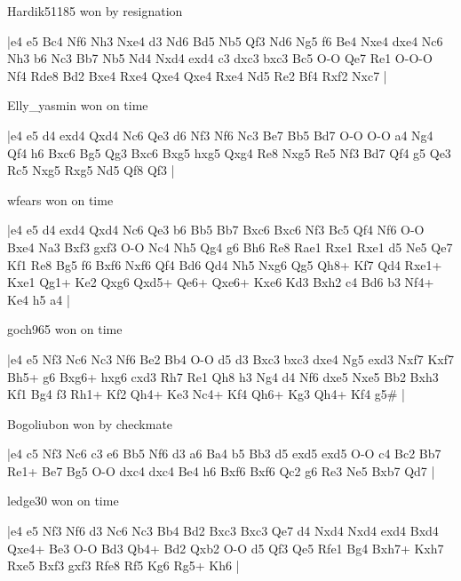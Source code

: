 \showboard

Hardik51185 won by resignation

\makegametitle
|e4 e5 Bc4 Nf6 Nh3 Nxe4 d3 Nd6 Bd5 Nb5 Qf3 Nd6 Ng5 f6 Be4 Nxe4 dxe4 Nc6 Nh3 b6 Nc3 Bb7 Nb5 Nd4 Nxd4 exd4 c3 dxc3 bxc3 Bc5 O-O Qe7 Re1 O-O-O Nf4 Rde8 Bd2 Bxe4 Rxe4 Qxe4 Qxe4 Rxe4 Nd5 Re2 Bf4 Rxf2 Nxc7  |

\showboard

Elly\_yasmin won on time

\makegametitle
|e4 e5 d4 exd4 Qxd4 Nc6 Qe3 d6 Nf3 Nf6 Nc3 Be7 Bb5 Bd7 O-O O-O a4 Ng4 Qf4 h6 Bxc6 Bg5 Qg3 Bxc6 Bxg5 hxg5 Qxg4 Re8 Nxg5 Re5 Nf3 Bd7 Qf4 g5 Qe3 Rc5 Nxg5 Rxg5 Nd5 Qf8 Qf3  |

\showboard

wfears won on time

\makegametitle
|e4 e5 d4 exd4 Qxd4 Nc6 Qe3 b6 Bb5 Bb7 Bxc6 Bxc6 Nf3 Bc5 Qf4 Nf6 O-O Bxe4 Na3 Bxf3 gxf3 O-O Nc4 Nh5 Qg4 g6 Bh6 Re8 Rae1 Rxe1 Rxe1 d5 Ne5 Qe7 Kf1 Re8 Bg5 f6 Bxf6 Nxf6 Qf4 Bd6 Qd4 Nh5 Nxg6 Qg5 Qh8+ Kf7 Qd4 Rxe1+ Kxe1 Qg1+ Ke2 Qxg6 Qxd5+ Qe6+ Qxe6+ Kxe6 Kd3 Bxh2 c4 Bd6 b3 Nf4+ Ke4 h5 a4  |

\showboard

goch965 won on time

\makegametitle
|e4 e5 Nf3 Nc6 Nc3 Nf6 Be2 Bb4 O-O d5 d3 Bxc3 bxc3 dxe4 Ng5 exd3 Nxf7 Kxf7 Bh5+ g6 Bxg6+ hxg6 cxd3 Rh7 Re1 Qh8 h3 Ng4 d4 Nf6 dxe5 Nxe5 Bb2 Bxh3 Kf1 Bg4 f3 Rh1+ Kf2 Qh4+ Ke3 Nc4+ Kf4 Qh6+ Kg3 Qh4+ Kf4 g5\#  |

\showboard

Bogoliubon won by checkmate

\makegametitle
|e4 c5 Nf3 Nc6 c3 e6 Bb5 Nf6 d3 a6 Ba4 b5 Bb3 d5 exd5 exd5 O-O c4 Bc2 Bb7 Re1+ Be7 Bg5 O-O dxc4 dxc4 Be4 h6 Bxf6 Bxf6 Qc2 g6 Re3 Ne5 Bxb7 Qd7  |

\showboard

ledge30 won on time

\makegametitle
|e4 e5 Nf3 Nf6 d3 Nc6 Nc3 Bb4 Bd2 Bxc3 Bxc3 Qe7 d4 Nxd4 Nxd4 exd4 Bxd4 Qxe4+ Be3 O-O Bd3 Qb4+ Bd2 Qxb2 O-O d5 Qf3 Qe5 Rfe1 Bg4 Bxh7+ Kxh7 Rxe5 Bxf3 gxf3 Rfe8 Rf5 Kg6 Rg5+ Kh6  |


